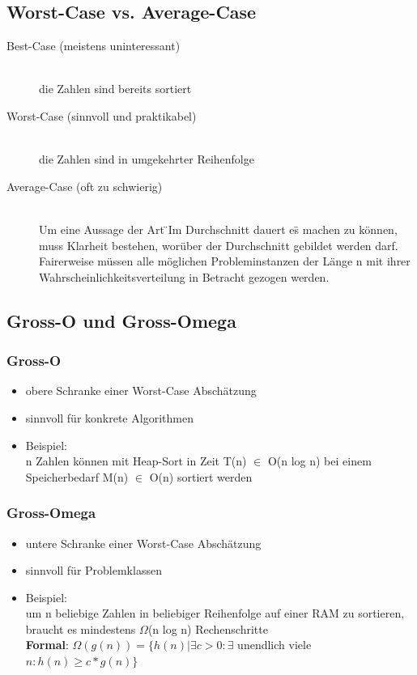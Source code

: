 \documentclass[a4paper,10pt]{article}
\newcommand{\Bold}[1]{\textbf{#1}} %
\begin{document}
\subsection{Worst-Case vs. Average-Case}
\begin{description}
		\item[Best-Case (meistens uninteressant)] \hfill \\
			die Zahlen sind bereits sortiert
		\item[Worst-Case (sinnvoll und praktikabel)] \hfill \\
			die Zahlen sind in umgekehrter Reihenfolge
		\item[Average-Case (oft zu schwierig)] \hfill \\
			Um eine Aussage der Art \"{ }Im Durchschnitt dauert es\"{ }  machen zu können, muss Klarheit bestehen, worüber der Durchschnitt gebildet werden darf. Fairerweise müssen alle m\"oglichen Probleminstanzen der Länge n mit ihrer Wahrscheinlichkeitsverteilung in Betracht gezogen werden.
\end{description}

\subsection{Gross-O und Gross-Omega}
\subsubsection{Gross-O}
\begin{itemize}
	\item obere Schranke einer Worst-Case Absch\"atzung
	\item sinnvoll für konkrete Algorithmen
	\item Beispiel: \\
		n Zahlen können mit Heap-Sort in Zeit T(n) $\in$ O(n log n) bei einem
Speicherbedarf M(n) $\in$ O(n) sortiert werden
\end{itemize}
\subsubsection{Gross-Omega}
\begin{itemize}
	\item untere Schranke einer Worst-Case Absch\"atzung
	\item sinnvoll für Problemklassen
	\item Beispiel: \\
		um n beliebige Zahlen in beliebiger Reihenfolge auf einer RAM zu sortieren, braucht es mindestens $\Omega$(n log n) Rechenschritte \\
	\Bold {Formal}: $ \Omega (g(n))  = \{  h(n) | \exists c > 0 : \exists $ unendlich viele $n:h(n) \geq c * g(n) \}$
\end{itemize}
\end{document}
